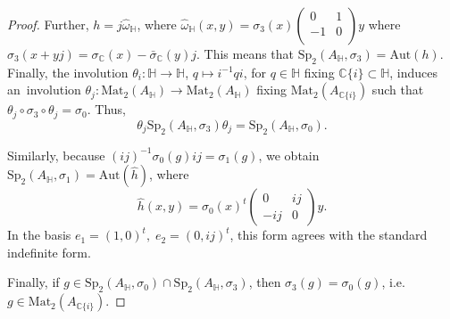 \documentclass[10pt,a4paper]{amsart}
\begin{document}
\begin{proof}
 \noindent Further, $h=j\hat\omega_\mathbb H$, where $\hat\omega_\mathbb H(x,y)=\sigma_3(x)\begin{pmatrix}
   0 & 1  \\
   -1 & 0  \\
\end{pmatrix} y$ where $\sigma_3(x+yj)={\sigma}_{\mathbb{C}}(x)-\bar{\sigma}_{\mathbb{C}}(y)j$. This means that $\mathrm{Sp}_2(A_\mathbb H,\sigma_3)=\mathrm{Aut}(h)$. Finally, the involution $\theta_i\colon \mathbb H\to\mathbb H$, $q\mapsto i^{-1}qi$, for $q\in\mathbb H$ fixing $\mathbb C\{i\}\subset\mathbb H$, induces an~involution $\theta_j\colon\mathrm{Mat}_2(A_\mathbb H)\to \mathrm{Mat}_2(A_\mathbb H)$ fixing $\mathrm{Mat}_2(A_{\mathbb C\{i\}})$ such that $\theta_j\circ\sigma_3\circ\theta_j=\sigma_0$. Thus, 
$$
\theta_j\mathrm{Sp}_2(A_\mathbb H,\sigma_3)\theta_j=\mathrm{Sp}_2(A_\mathbb H,\sigma_0).$$

\noindent  Similarly, because $(ij)^{-1}\sigma_0(g)ij=\sigma_1(g)$, we obtain $\mathrm{Sp}_2(A_\mathbb H,\sigma_1)=\mathrm{Aut}(\hat h)$, where 
$$\hat h(x,y)=\sigma_0(x)^t\begin{pmatrix}
    0 & ij \\
    -ij & 0
\end{pmatrix}y.$$
In the basis $e_1=(1,0)^t,\;e_2=(0,ij)^t$, this form agrees with the standard indefinite form.

 \noindent Finally, if $g\in \mathrm{Sp}_{2}(A_\mathbb H,\sigma_0)\cap \mathrm{Sp}_{2}(A_\mathbb H,\sigma_3)$, then $\sigma_3(g)=\sigma_0(g)$, i.e. $g\in\mathrm{Mat}_2(A_{\mathbb C\{i\}})$.

\end{proof}
\end{document}
